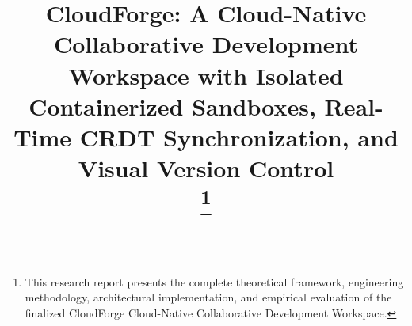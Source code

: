 \documentclass[conference]{IEEEtran}
\begin{document}
\title{CloudForge: A Cloud-Native Collaborative Development Workspace with Isolated Containerized Sandboxes, Real-Time CRDT Synchronization, and Visual Version Control\\
\thanks{This research report presents the complete theoretical framework, engineering methodology, architectural implementation, and empirical evaluation of the finalized CloudForge Cloud-Native Collaborative Development Workspace.}
}

\author{
}

\maketitle
\end{document}
